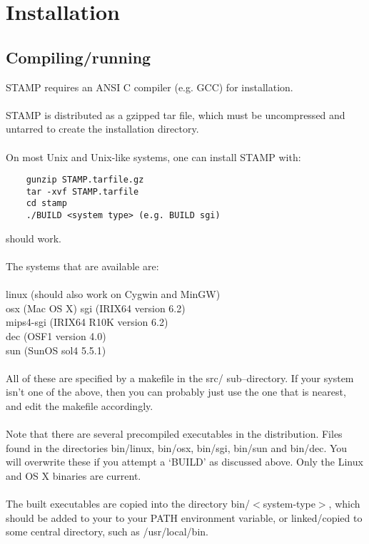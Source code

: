     \chapter{Installation}

    \section{Compiling/running}

    STAMP requires an ANSI C compiler (e.g. GCC) for installation. \\
    \\
    STAMP is distributed as a gzipped tar file, which must be 
    uncompressed and untarred to create the installation directory.\\
    \\
    On most Unix and Unix-like systems, one can install STAMP with:\\

    \begin{scriptsize}\begin{verbatim}
    gunzip STAMP.tarfile.gz
    tar -xvf STAMP.tarfile
    cd stamp
    ./BUILD <system type> (e.g. BUILD sgi)
    \end{verbatim} \end{scriptsize}

    should work.\\
    \\

    The systems that are available are:\\
    \\
    linux (should also work on Cygwin and MinGW)\\
    osx (Mac OS X)
    sgi (IRIX64 version 6.2)\\
    mips4-sgi (IRIX64 R10K version 6.2)\\
    dec (OSF1 version 4.0)\\
    sun (SunOS sol4 5.5.1)\\
    \\
    All of these are specified by a makefile in the src/ sub--directory.  If your system
    isn't one of the above, then you can probably just use the one that is nearest, and edit
    the makefile accordingly.\\ 
    \\
    Note that there are several precompiled executables in the distribution.  Files
    found in the directories bin/linux, bin/osx, bin/sgi, bin/sun and bin/dec.  You will
    overwrite these if you attempt a `BUILD' as discussed above. Only the Linux and OS X
    binaries are current.
    \\
    \\
    The built executables are 
    copied into the directory bin/$<$system-type$>$, which should be added to 
    your to your PATH environment variable, or linked/copied to some central 
    directory, such as /usr/local/bin.

